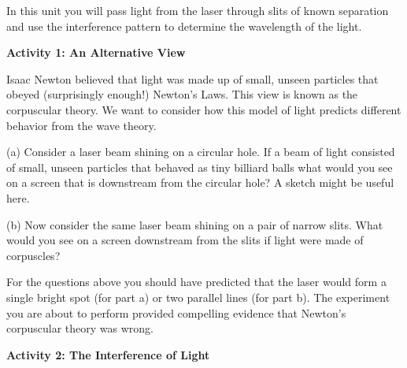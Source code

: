\vspace{0.3cm}
{\centering {} \par}
\vspace{0.3cm}

In this unit you will pass light from the laser through slits of known
separation and use the interference pattern to determine the wavelength
of the light.

\textbf{Activity 1: An Alternative View}

Isaac Newton believed that light was made up of small, unseen particles
that obeyed (surprisingly enough!) Newton's Laws. This view is known
as the corpuscular theory. We want to consider how this model of light
predicts different behavior from the wave theory.

\vspace{35mm}
(a) Consider a laser beam shining on a circular hole. If a beam of
light consisted of small, unseen particles that behaved as tiny billiard
balls what would you see on a screen that is downstream from the circular
hole? A sketch might be useful here.
\vspace{30mm}

(b) Now consider the same laser beam shining on a pair of narrow slits.
What would you see on a screen downstream from the slits if light
were made of corpuscles?
\vspace{30mm}

For the questions above you should have predicted that the laser would
form a single bright spot (for part a) or two parallel lines (for part
b). The experiment you are about to perform provided compelling evidence
that Newton's corpuscular theory was wrong. 

\textbf{Activity 2: The Interference of Light }

